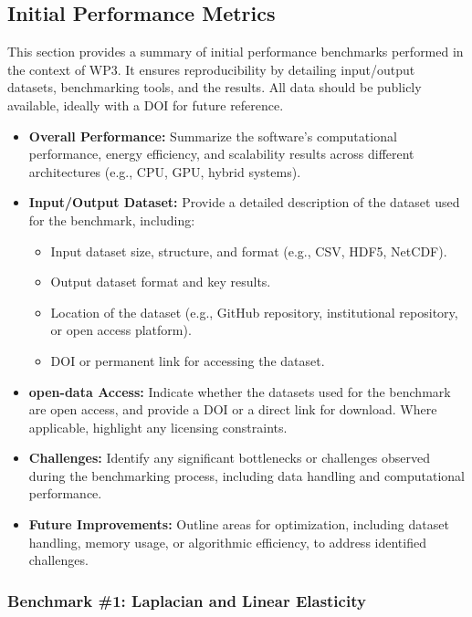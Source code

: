 \subsection{Initial Performance Metrics}
\label{sec:WP3:Feelpp:metrics}

This section provides a summary of initial performance benchmarks performed in the context of WP3. It ensures reproducibility by detailing input/output datasets, benchmarking tools, and the results. All data should be publicly available, ideally with a DOI for future reference.

\begin{itemize}
    \item \textbf{Overall Performance:} Summarize the software's computational performance, energy efficiency, and scalability results across different architectures (e.g., CPU, GPU, hybrid systems).
    \item \textbf{Input/Output Dataset:} Provide a detailed description of the dataset used for the benchmark, including:
        \begin{itemize}
            \item Input dataset size, structure, and format (e.g., CSV, HDF5, NetCDF).
            \item Output dataset format and key results.
            \item Location of the dataset (e.g., GitHub repository, institutional repository, or open access platform).
            \item DOI or permanent link for accessing the dataset.
        \end{itemize}
    \item \textbf{open-data Access:} Indicate whether the datasets used for the benchmark are open access, and provide a DOI or a direct link for download. Where applicable, highlight any licensing constraints.
    \item \textbf{Challenges:} Identify any significant bottlenecks or challenges observed during the benchmarking process, including data handling and computational performance.
    \item \textbf{Future Improvements:} Outline areas for optimization, including dataset handling, memory usage, or algorithmic efficiency, to address identified challenges.
\end{itemize}

\subsubsection{Benchmark \#1: Laplacian and Linear Elasticity}

